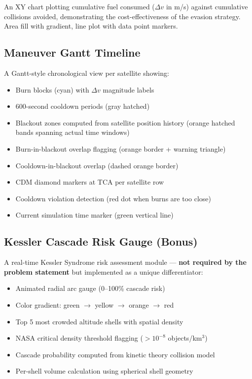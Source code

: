 \documentclass[11pt,a4paper]{article}
\begin{document}
An XY chart plotting cumulative fuel consumed ($\Delta v$ in m/s) against
cumulative collisions avoided, demonstrating the cost-effectiveness of the
evasion strategy. Area fill with gradient, line plot with data point markers.

\subsection{Maneuver Gantt Timeline}

A Gantt-style chronological view per satellite showing:

\begin{itemize}[nosep]
  \item Burn blocks (cyan) with $\Delta v$ magnitude labels
  \item 600-second cooldown periods (gray hatched)
  \item Blackout zones computed from satellite position history
        (orange hatched bands spanning actual time windows)
  \item Burn-in-blackout overlap flagging (orange border + warning triangle)
  \item Cooldown-in-blackout overlap (dashed orange border)
  \item CDM diamond markers at TCA per satellite row
  \item Cooldown violation detection (red dot when burns are too close)
  \item Current simulation time marker (green vertical line)
\end{itemize}

\subsection{Kessler Cascade Risk Gauge (Bonus)}

A real-time Kessler Syndrome risk assessment module --- \textbf{not required by
the problem statement} but implemented as a unique differentiator:

\begin{itemize}[nosep]
  \item Animated radial arc gauge (0--100\% cascade risk)
  \item Color gradient: green $\to$ yellow $\to$ orange $\to$ red
  \item Top 5 most crowded altitude shells with spatial density
  \item NASA critical density threshold flagging ($> 10^{-8}$ objects/km$^3$)
  \item Cascade probability computed from kinetic theory collision model
  \item Per-shell volume calculation using spherical shell geometry
\end{itemize}
\end{document}
